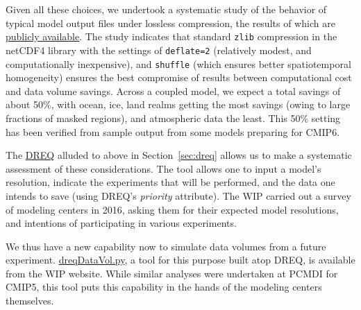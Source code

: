 \documentclass[gmd,manuscript]{copernicus}
\newcommand{\secref}[1] {\mbox{Section  \ref{sec:#1}}}
\begin{document}
\begin{enumerate}
  Given all these choices, we undertook a systematic study of the
  behavior of typical model output files under lossless compression,
  the results of which are \href{https://goo.gl/qkdDnn}{publicly 
  available}. The study indicates that standard \texttt{zlib}
  compression in the netCDF4 library with the settings of
  \texttt{deflate=2} (relatively modest, and computationally
  inexpensive), and \texttt{shuffle} (which ensures better
  spatiotemporal homogeneity) ensures the best compromise of results
  between computational cost and data volume savings. Across a coupled
  model, we expect a total savings of about 50\%, with ocean, ice,
  land realms getting the most savings (owing to large fractions of
  masked regions), and atmospheric data the least. This 50\% setting
  has been verified from sample output from some models preparing for
  CMIP6.
\end{enumerate}

The \href{https://goo.gl/iNBQ9m}{DREQ} alluded to above in
\secref{dreq} allows us to make a systematic assessment of these
considerations. The tool allows one to input a model's resolution,
indicate the experiments that will be performed, and the data
one intends to save (using DREQ's \emph{priority} attribute). The WIP
carried out a survey of modeling centers in 2016, asking them for
their expected model resolutions, and intentions of participating in
various experiments. 

We thus have a new capability now to
simulate data volumes from a future experiment.
\href{https://goo.gl/Ezz5v3}{dreqDataVol.py}, a tool for this purpose
built atop DREQ, is available from the WIP website. While similar
analyses were undertaken at PCMDI for CMIP5, this tool puts this
capability in the hands of the modeling centers themselves.
\end{document}
